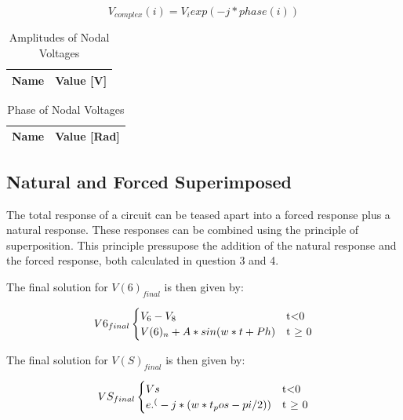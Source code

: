\begin{equation}
V_{complex}(i)=V_i exp(-j*phase(i))
\end{equation} 


\begin{table}[ht]

  \centering
  \begin{tabular}{|l|r|}
    \hline    
    {\bf Name} & {\bf Value [V]} \\ \hline
    
  \end{tabular}
  \caption{Amplitudes of Nodal Voltages} 
\end{table}


\begin{table}[ht]

  \centering
  \begin{tabular}{|l|r|}
    \hline    
    {\bf Name} & {\bf Value [Rad]} \\ \hline
    
  \end{tabular}
  \caption{Phase of Nodal Voltages} 
\end{table}




\newpage



\subsection{Natural and Forced Superimposed}


The total response of a circuit can be teased apart into a forced response plus a natural response. These responses can be combined using the principle of superposition. This principle pressupose the addition of the natural response and the forced response, both calculated in question 3 and 4.

The final solution for $V(6)_{final}$  is then given by:


\begin{equation}
V6_{final}
\begin{cases}
V_{6}-V_{8} & $t$ < $0$ \\
V(6)_{n} + A*sin(w*t+Ph) & $t $\geq$ 0$
\end{cases}
\label {eq:n2}
\end{equation}



The final solution for $V(S)_{final}$  is then given by:

\begin{equation}
VS_{final}
\begin{cases}
Vs & $t$ < $0$ \\
e.^(-j*(w*t_pos-pi/2))& $t $\geq$ 0$
\end{cases}
\label {eq:n2}
\end{equation}


